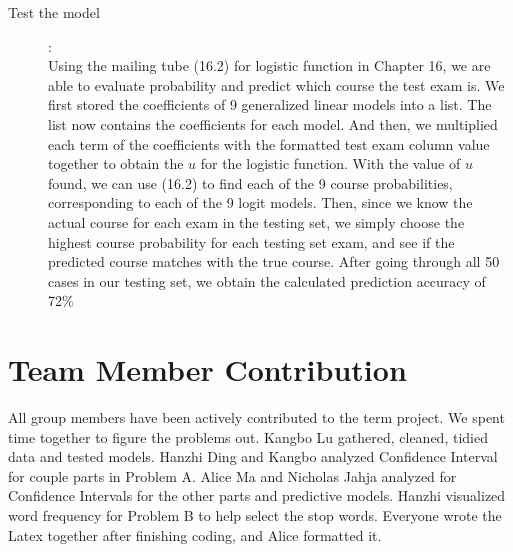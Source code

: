\documentclass{article}
\begin{document}
\begin{description}
        \item [Test the model]:\\
        Using the mailing tube (16.2) for logistic function in Chapter 16, we are able to evaluate probability and predict which course the test exam is. We first stored the coefficients of 9 generalized linear models into a list. The list now contains the coefficients for each model. And then, we multiplied each term of the coefficients with the formatted test exam column value together to obtain the $u$ for the logistic function. With the value of $u$ found, we can use (16.2) to find each of the 9 course probabilities, corresponding to each of the 9 logit models. Then, since we know the actual course for each exam in the testing set, we simply choose the highest course probability for each testing set exam, and see if the predicted course matches with the true course. After going through all 50 cases in our testing set, we obtain the calculated prediction accuracy of 72\%
        
        \end{description}
\section{Team Member Contribution}
     All group members have been actively contributed to the term project. We spent time together to figure the problems out. Kangbo Lu gathered, cleaned, tidied data and tested models. Hanzhi Ding and Kangbo analyzed Confidence Interval for couple parts in Problem A. Alice Ma and Nicholas Jahja analyzed for Confidence Intervals for the other parts and predictive models. Hanzhi visualized word frequency for Problem B to help select the stop words. Everyone wrote the Latex together after finishing coding, and Alice formatted it.
\end{document}
